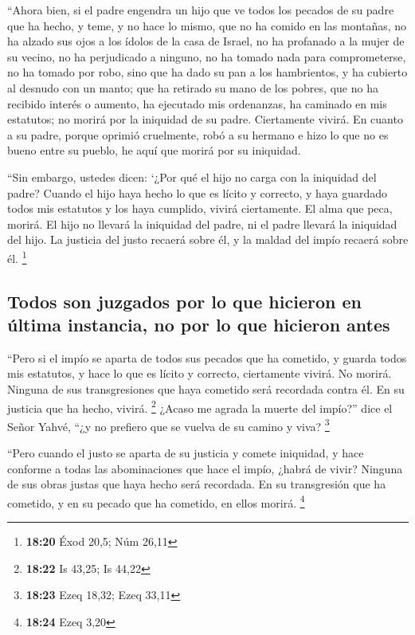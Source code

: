 \begin{paracol}{2}
 ``Ahora bien, si el padre engendra un hijo que ve todos
los pecados de su padre que ha hecho, y teme, y no hace lo mismo,
 que no ha comido en las montañas, no ha alzado sus ojos
a los ídolos de la casa de Israel, no ha profanado a la mujer de su
vecino,  no ha perjudicado a ninguno, no ha tomado nada
para comprometerse, no ha tomado por robo, sino que ha dado su pan a los
hambrientos, y ha cubierto al desnudo con un manto;  que
ha retirado su mano de los pobres, que no ha recibido interés o aumento,
ha ejecutado mis ordenanzas, ha caminado en mis estatutos; no morirá por
la iniquidad de su padre. Ciertamente vivirá.  En cuanto
a su padre, porque oprimió cruelmente, robó a su hermano e hizo lo que
no es bueno entre su pueblo, he aquí que morirá por su iniquidad.

 ``Sin embargo, ustedes dicen: `¿Por qué el hijo no carga
con la iniquidad del padre? Cuando el hijo haya hecho lo que es lícito y
correcto, y haya guardado todos mis estatutos y los haya cumplido,
vivirá ciertamente.  El alma que peca, morirá. El hijo no
llevará la iniquidad del padre, ni el padre llevará la iniquidad del
hijo. La justicia del justo recaerá sobre él, y la maldad del impío
recaerá sobre él. \footnote{\textbf{18:20} Éxod 20,5; Núm 26,11}

\hypertarget{todos-son-juzgados-por-lo-que-hicieron-en-uxfaltima-instancia-no-por-lo-que-hicieron-antes}{%
\subsection{Todos son juzgados por lo que hicieron en última instancia,
no por lo que hicieron
antes}\label{todos-son-juzgados-por-lo-que-hicieron-en-uxfaltima-instancia-no-por-lo-que-hicieron-antes}}

 ``Pero si el impío se aparta de todos sus pecados que ha
cometido, y guarda todos mis estatutos, y hace lo que es lícito y
correcto, ciertamente vivirá. No morirá.  Ninguna de sus
transgresiones que haya cometido será recordada contra él. En su
justicia que ha hecho, vivirá. \footnote{\textbf{18:22} Is 43,25; Is
  44,22}  ¿Acaso me agrada la muerte del impío?'' dice el
Señor Yahvé, ``¿y no prefiero que se vuelva de su camino y viva?
\footnote{\textbf{18:23} Ezeq 18,32; Ezeq 33,11}

 ``Pero cuando el justo se aparta de su justicia y comete
iniquidad, y hace conforme a todas las abominaciones que hace el impío,
¿habrá de vivir? Ninguna de sus obras justas que haya hecho será
recordada. En su transgresión que ha cometido, y en su pecado que ha
cometido, en ellos morirá. \footnote{\textbf{18:24} Ezeq 3,20}


\end{paracol}
